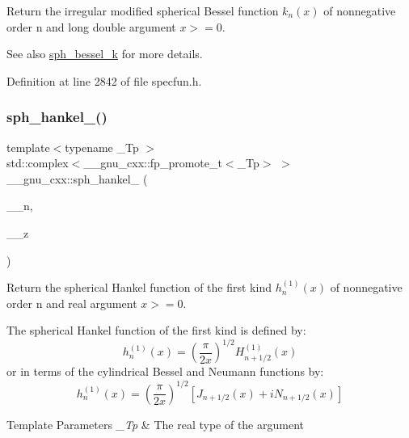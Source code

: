 Return the irregular modified spherical Bessel function $ k_n(x) $ of nonnegative order n and {\ttfamily long double} argument $ x >= 0 $.

\begin{DoxySeeAlso}{See also}
\hyperlink{group__mathsf__gnu_ga288b28f2c6995d052a4f5f17293cbf1a}{sph\+\_\+bessel\+\_\+k} for more details. 
\end{DoxySeeAlso}


Definition at line 2842 of file specfun.\+h.

\mbox{\label{group__mathsf__gnu_ga4424f565fb224ab88b177beb65d08305}} 
\subsubsection{\texorpdfstring{sph\+\_\+hankel\+\_()}{sph\_hankel\_1()}\hspace{0.1cm}{\footnotesize\ttfamily [1/2]}}
{\footnotesize\ttfamily template$<$typename \+\_\+\+Tp $>$ \\
std\+::complex$<$\+\_\+\+\_\+gnu\+\_\+cxx\+::fp\+\_\+promote\+\_\+t$<$\+\_\+\+Tp$>$ $>$ \+\_\+\+\_\+gnu\+\_\+cxx\+::sph\+\_\+hankel\+\_ (\begin{DoxyParamCaption}\item[{unsigned int}]{\+\_\+\+\_\+n,  }\item[{\+\_\+\+Tp}]{\+\_\+\+\_\+z }\end{DoxyParamCaption})\hspace{0.3cm}{\ttfamily [inline]}}

Return the spherical Hankel function of the first kind $ h^{(1)}_n(x) $ of nonnegative order {\ttfamily n} and real argument $ x >= 0 $.

The spherical Hankel function of the first kind is defined by\+: \[ h^{(1)}_n(x) = \left(\frac{\pi}{2x} \right) ^{1/2} H^{(1)}_{n+1/2}(x) \] or in terms of the cylindrical Bessel and Neumann functions by\+: \[ h^{(1)}_n(x) = \left(\frac{\pi}{2x} \right) ^{1/2} \left[ J_{n+1/2}(x) + iN_{n+1/2}(x) \right] \]


\begin{DoxyTemplParams}{Template Parameters}
{\em \+\_\+\+Tp} & The real type of the argument \\
\hline
\end{DoxyTemplParams}


